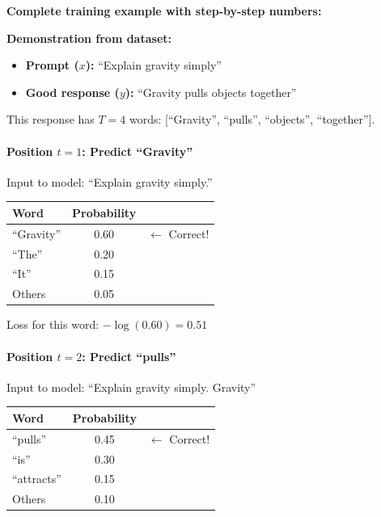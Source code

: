 \begin{chapterenv}
\textbf{Complete training example with step-by-step numbers:}

\textbf{Demonstration from dataset:}
\begin{itemize}[nosep]
    \item \textbf{Prompt ($x$):} ``Explain gravity simply''
    \item \textbf{Good response ($y$):} ``Gravity pulls objects together''
\end{itemize}

This response has $T = 4$ words: [``Gravity'', ``pulls'', ``objects'', ``together''].

\paragraph{Position $t=1$: Predict ``Gravity''}

Input to model: ``Explain gravity simply.''

\begin{center}
\begin{tabular}{lcc}
\toprule
\textbf{Word} & \textbf{Probability} & \\
\midrule
``Gravity'' & 0.60 & $\leftarrow$ Correct! \\
``The'' & 0.20 & \\
``It'' & 0.15 & \\
Others & 0.05 & \\
\bottomrule
\end{tabular}
\end{center}

Loss for this word: $-\log(0.60) = 0.51$

\paragraph{Position $t=2$: Predict ``pulls''}

Input to model: ``Explain gravity simply. Gravity''

\begin{center}
\begin{tabular}{lcc}
\toprule
\textbf{Word} & \textbf{Probability} & \\
\midrule
``pulls'' & 0.45 & $\leftarrow$ Correct! \\
``is'' & 0.30 & \\
``attracts'' & 0.15 & \\
Others & 0.10 & \\
\bottomrule
\end{tabular}
\end{center}


\end{chapterenv}

